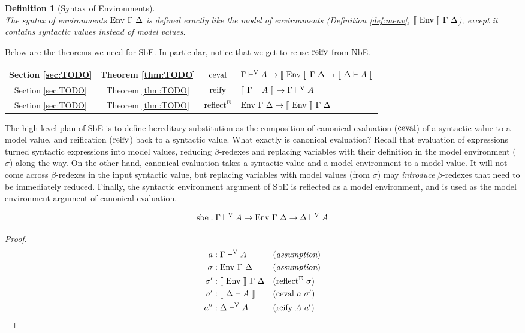 \documentclass{llncs}
\newtheorem{defin}{Definition}
\newcommand{\refdef}[1]{Definition \ref{def:#1}}
\newcommand{\refthm}[1]{Theorem \ref{thm:#1}}
\newcommand{\refsec}[1]{Section \ref{sec:#1}}
\def\marr{\rightarrow}
\def\reify{\fun{reify}}
\def\reflecte{\fun{reflect}^\con{E}}
\def\cevalv{\fun{ceval}}
\def\sbe{\fun{sbe}}
\def\byass{(\textit{assumption})}
\newcommand{\by}[1]{(#1)}
\newcommand{\turn}[1]{\vdash^\con{#1}}
\newcommand{\el}[1]{\llbracket ~ #1 ~ \rrbracket}
\newcommand{\con}[1]{\textmd{#1}}
\newcommand{\fun}[1]{\textmd{#1}}
\newcommand{\typm}[1]{\el{\Gamma \vdash #1}}
\newcommand{\dtypm}[1]{\el{\Delta \vdash #1}}
\newcommand{\typv}[1]{\Gamma \turn{V} #1}
\newcommand{\dtypv}[1]{\Delta \turn{V} #1}
\def\menv{\el{\fun{Env}}~\Gamma~\Delta}
\def\env{\fun{Env}~\Gamma~\Delta}
\begin{document}
\begin{defin}[Syntax of Environments]
\label{def:senv}
$ $\\
The syntax of environments $\env$ is defined exactly like the model of
environments (\refdef{menv}, $\menv$), except it contains syntactic values
instead of model values.
\end{defin}

Below are the theorems we need for SbE. In particular, notice that we
get to reuse $\reify$ from NbE.

\hfill \break
\begin{tabularx}{\textwidth}{ |c|c|c|X| }
  \hline
  \refsec{TODO} & \refthm{TODO} & $\cevalv$ & $\typv{A} \marr \menv \marr \dtypm{A}$ \\
  \hline
  \refsec{TODO} & \refthm{TODO} & $\reify$ & $\typm{A} \marr \typv{A}$ \\
  \hline
  \refsec{TODO} & \refthm{TODO} & $\reflecte$ & $\env \marr \menv$ \\
  \hline
\end{tabularx}
\hfill \break

The high-level plan of SbE is to define
hereditary substitution as the composition of
canonical evaluation ($\cevalv$) of a syntactic value to a
model value, and reification ($\reify$) back to a syntactic value.
What exactly is canonical evaluation? Recall that evaluation of
expressions turned syntactic expressions into model values, reducing
$\beta$-redexes and replacing variables with their definition in the
model environment ($\sigma$) along the way. On the other hand,
canonical evaluation takes a syntactic value and a model environment
to a model value. It will not come across $\beta$-redexes in the input
syntactic value, but replacing variables with model values (from
$\sigma$) may \textit{introduce} $\beta$-redexes that need to be
immediately reduced. Finally, the syntactic environment argument of
SbE is reflected as a model environment, and is used as the model
environment argument of canonical evaluation.

\begin{theorem}
\label{thm:mod:vhsub}
$$
\sbe : \typv{A} \marr \env \marr \dtypv{A}
$$

\begin{proof}
\begin{align*}
a    &: \typv{A} && \byass\\
\sigma   &: \env && \byass\\
\sigma'  &: \menv && \by{\reflecte~\sigma}\\
a'   &: \dtypm{A} && \by{\cevalv~a~\sigma'}\\
a''  &: \dtypv{A} && \by{\reify~A~a'}
\end{align*}
\end{proof}

\end{theorem}
\end{document}
